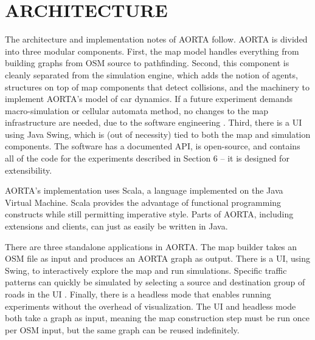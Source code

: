 \documentclass[letterpaper, 10 pt, conference]{ieeeconf}  %
\newcommand{\pix}[3]{
  \begin{figure}[h]
    \centering \texttt{[image: \#1]}
    \caption{#2}
  \end{figure}
}
\begin{document}

\section{ARCHITECTURE}



The architecture and implementation notes of AORTA follow. AORTA is divided
into three modular components. First, the map
model handles everything from building graphs from OSM source to pathfinding.
Second, this component is cleanly separated from the simulation engine, which adds the
notion of agents, structures on top of map components that detect collisions,
and the machinery to implement AORTA's model of car dynamics. If a future
experiment demands macro-simulation or cellular automata method, no changes to
the map infrastructure are needed, due to the software engineering
. Third, there
is a UI using Java Swing, which is (out of necessity) tied to both the map and
simulation components. The software has a documented API, is open-source, and
contains all of the code for the experiments described in Section 6 -- it is
designed for extensibility. 

AORTA's implementation uses Scala, a language implemented on the Java Virtual
Machine. Scala provides the advantage of functional programming constructs while
still permitting imperative style. Parts of AORTA, including extensions and clients, can
just as easily be written in Java.

 There are three
standalone applications in AORTA. The map builder takes an OSM file as input
and produces an AORTA graph as output. There is a UI, using Swing, to
interactively explore the map and run simulations. Specific traffic patterns
can quickly be simulated by selecting a source and destination group of roads
in the UI .
Finally, there is a headless mode that enables running experiments without
the overhead of visualization. The UI and headless mode both take a graph as
input, meaning the map construction step must be run once per OSM input, but
the same graph can be reused indefinitely.
\end{document}

